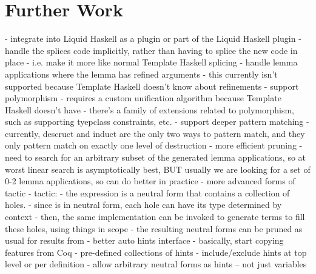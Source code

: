 \section{Further Work}

- integrate into Liquid Haskell as a plugin or part of the Liquid Haskell plugin
- handle the splices code implicitly, rather than having to splice the new code in place
  - i.e. make it more like normal Template Haskell splicing
- handle lemma applications where the lemma has refined arguments
  - this currently isn't supported because Template Haskell doesn't know about refinements
- support polymorphism
  - requires a custom unification algorithm because Template Haskell doesn't have 
  - there's a family of extensions related to polymorphism, such as supporting tyepclass constraints, etc.
- support deeper pattern matching
  - currently, descruct and induct are the only two ways to pattern match, and they only pattern match on exactly one level of destruction
- more efficient pruning
  - need to search for an arbitrary subset of the generated lemma applications, so at worst linear search is asymptotically best, BUT usually we are looking for a set of 0-2 lemma applications, so can do better in practice 
- more advanced forms of  tactic
  -  tactic:
    - the expression  is a neutral form that contains a collection of holes.
    - since  is in neutral form, each hole can have its type determined by context
    - then, the same  implementation can be invoked to generate terms to fill these holes, using things in scope
    - the resulting neutral forms can be pruned as usual for results from 
- better auto hints interface
  - basically, start copying features from Coq 
  - pre-defined collections of hints
  - include/exclude hints at top level or per definition
  - allow arbitrary neutral forms as hints -- not just variables